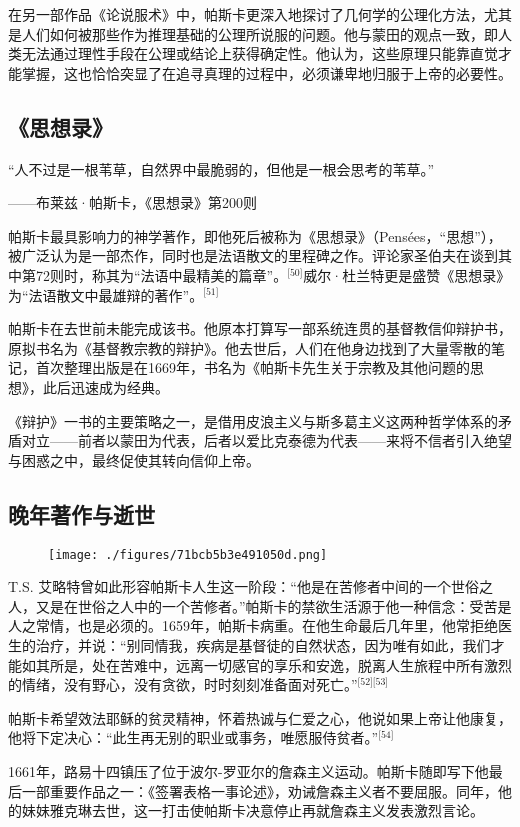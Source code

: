 在另一部作品《论说服术》中，帕斯卡更深入地探讨了几何学的公理化方法，尤其是人们如何被那些作为推理基础的公理所说服的问题。他与蒙田的观点一致，即人类无法通过理性手段在公理或结论上获得确定性。他认为，这些原理只能靠直觉才能掌握，这也恰恰突显了在追寻真理的过程中，必须谦卑地归服于上帝的必要性。
\subsection{《思想录》}
“人不过是一根苇草，自然界中最脆弱的，但他是一根会思考的苇草。”

——布莱兹·帕斯卡，《思想录》第200则

帕斯卡最具影响力的神学著作，即他死后被称为《思想录》（Pensées，“思想”），被广泛认为是一部杰作，同时也是法语散文的里程碑之作。评论家圣伯夫在谈到其中第72则时，称其为“法语中最精美的篇章”。\(^\text{[50]}\)威尔·杜兰特更是盛赞《思想录》为“法语散文中最雄辩的著作”。\(^\text{[51]}\)

帕斯卡在去世前未能完成该书。他原本打算写一部系统连贯的基督教信仰辩护书，原拟书名为《基督教宗教的辩护》。他去世后，人们在他身边找到了大量零散的笔记，首次整理出版是在1669年，书名为《帕斯卡先生关于宗教及其他问题的思想》，此后迅速成为经典。

《辩护》一书的主要策略之一，是借用皮浪主义与斯多葛主义这两种哲学体系的矛盾对立——前者以蒙田为代表，后者以爱比克泰德为代表——来将不信者引入绝望与困惑之中，最终促使其转向信仰上帝。
\subsection{晚年著作与逝世}
\begin{figure}[ht]
\centering
\texttt{[image: ./figures/71bcb5b3e491050d.png]}
\caption{} \label{fig_BLSpsk_11}
\end{figure}
T.S. 艾略特曾如此形容帕斯卡人生这一阶段：“他是在苦修者中间的一个世俗之人，又是在世俗之人中的一个苦修者。”帕斯卡的禁欲生活源于他一种信念：受苦是人之常情，也是必须的。1659年，帕斯卡病重。在他生命最后几年里，他常拒绝医生的治疗，并说：“别同情我，疾病是基督徒的自然状态，因为唯有如此，我们才能如其所是，处在苦难中，远离一切感官的享乐和安逸，脱离人生旅程中所有激烈的情绪，没有野心，没有贪欲，时时刻刻准备面对死亡。”\(^\text{[52][53]}\)

帕斯卡希望效法耶稣的贫灵精神，怀着热诚与仁爱之心，他说如果上帝让他康复，他将下定决心：“此生再无别的职业或事务，唯愿服侍贫者。”\(^\text{[54]}\)

1661年，路易十四镇压了位于波尔-罗亚尔的詹森主义运动。帕斯卡随即写下他最后一部重要作品之一：《签署表格一事论述》，劝诫詹森主义者不要屈服。同年，他的妹妹雅克琳去世，这一打击使帕斯卡决意停止再就詹森主义发表激烈言论。
